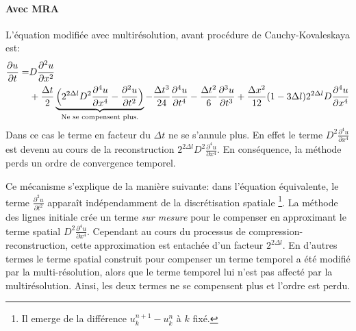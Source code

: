     \paragraph{Avec MRA}
        L'équation modifiée avec multirésolution, avant procédure de Cauchy-Kovaleskaya est:
        \begin{align}
            \frac{\partial u}{\partial  t} =&D \frac{\partial^{2} u}{\partial x^{2}}\\\notag
            &+ \frac{\Delta t}{2} \underbrace{\Bigl(2^{2 \Delta l} D^{2}           \frac{\partial^{4} u}{\partial x^{4}} -\frac{\partial^{2} u}{\partial t^{2}} \Bigr)}_{\text{Ne se compensent plus.}}
            -\frac{\Delta t^{3}}{24}                          \frac{\partial^{4} u}{\partial t^{4}} 
            - \frac{\Delta t^{2}}{6}                           \frac{\partial^{3} u}{\partial t^{3}}
            +\frac{\Delta x^{2}}{12} (1 - 3\Delta l)    2^{2 \Delta l} D \frac{\partial^{4} u}{\partial x^{4}}
        \end{align}
        Dans ce cas le terme en facteur du $\Delta t$ ne se s'annule plus. En effet le terme $D^{2}\frac{\partial^{4} u}{\partial x^{4}}$ est devenu au cours de la reconstruction
        $2^{2 \Delta l} D^{2}\frac{\partial^{4} u}{\partial x^{4}}$. En conséquence, la méthode perds un ordre de convergence temporel.\par
        Ce mécanisme s'explique de la manière suivante: dans l'équation équivalente, le terme $\frac{\partial^{2} u}{\partial t^{2}}$ apparaît indépendamment de la discrétisation spatiale
        \footnote{Il emerge de la différence $u_k^{n+1} - u_k^{n}$ à $k$ fixé.}. La méthode des lignes initiale crée un terme \textit{sur mesure} pour le compenser en approximant le terme spatial
        $D^{2}\frac{\partial^{4} u}{\partial x^{4}}$. Cependant au cours du processus de compression-reconstruction, cette approximation est entachée d'un facteur $2^{2 \Delta l}$.
        En d'autres termes le terme spatial construit pour compenser un terme temporel a été modifié par la multi-résolution, alors que le terme temporel lui n'est pas affecté par la multirésolution.
        Ainsi, les deux termes ne se compensent plus et l'ordre est perdu.

